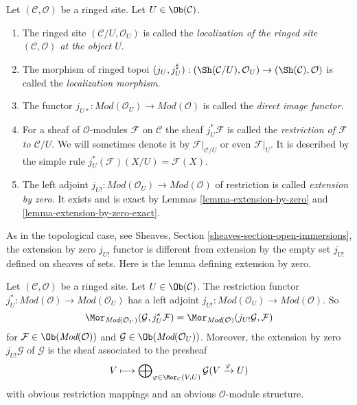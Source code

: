 \begin{definition}
\label{definition-localize-ringed-site}
Let $(\mathcal{C}, \mathcal{O})$ be a ringed site.
Let $U \in \Ob(\mathcal{C})$.
\begin{enumerate}
\item The ringed site $(\mathcal{C}/U, \mathcal{O}_U)$ is called the
{\it localization of the ringed site $(\mathcal{C}, \mathcal{O})$
at the object $U$}.
\item The morphism of ringed topoi
$(j_U, j_U^\sharp) :
(\Sh(\mathcal{C}/U), \mathcal{O}_U)
\to
(\Sh(\mathcal{C}), \mathcal{O})$
is called the {\it localization morphism}.
\item The functor
$j_{U*} : \textit{Mod}(\mathcal{O}_U) \to \textit{Mod}(\mathcal{O})$
is called the {\it direct image functor}.
\item For a sheaf of $\mathcal{O}$-modules $\mathcal{F}$ on $\mathcal{C}$
the sheaf $j_U^*\mathcal{F}$ is called the
{\it restriction of $\mathcal{F}$ to $\mathcal{C}/U$}.
We will sometimes denote it by
$\mathcal{F}|_{\mathcal{C}/U}$ or even $\mathcal{F}|_U$.
It is described by the simple rule $j_U^*(\mathcal{F})(X/U) = \mathcal{F}(X)$.
\item The left adjoint
$j_{U!} : \textit{Mod}(\mathcal{O}_U) \to \textit{Mod}(\mathcal{O})$
of restriction is called {\it extension by zero}. It exists and is
exact by
Lemmas \ref{lemma-extension-by-zero} and
\ref{lemma-extension-by-zero-exact}.
\end{enumerate}
\end{definition}

\noindent
As in the topological case, see
Sheaves, Section \ref{sheaves-section-open-immersions},
the extension by zero $j_{U!}$ functor is different from
extension by the empty set $j_{U!}$ defined on sheaves of sets.
Here is the lemma defining extension by zero.

\begin{lemma}
\label{lemma-extension-by-zero}
Let $(\mathcal{C}, \mathcal{O})$ be a ringed site.
Let $U \in \Ob(\mathcal{C})$.
The restriction functor
$j_U^* : \textit{Mod}(\mathcal{O}) \to \textit{Mod}(\mathcal{O}_U)$
has a left adjoint
$j_{U!} : \textit{Mod}(\mathcal{O}_U) \to \textit{Mod}(\mathcal{O})$.
So
$$
\Mor_{\textit{Mod}(\mathcal{O}_U)}(\mathcal{G}, j_U^*\mathcal{F})
=
\Mor_{\textit{Mod}(\mathcal{O})}(j_{U!}\mathcal{G}, \mathcal{F})
$$
for $\mathcal{F} \in \Ob(\textit{Mod}(\mathcal{O}))$
and $\mathcal{G} \in \Ob(\textit{Mod}(\mathcal{O}_U))$.
Moreover, the extension by zero $j_{U!}\mathcal{G}$ of $\mathcal{G}$
is the sheaf associated to the presheaf
$$
V
\longmapsto
\bigoplus\nolimits_{\varphi \in \Mor_\mathcal{C}(V, U)}
\mathcal{G}(V \xrightarrow{\varphi} U)
$$
with obvious restriction mappings and an obvious $\mathcal{O}$-module
structure.
\end{lemma}

